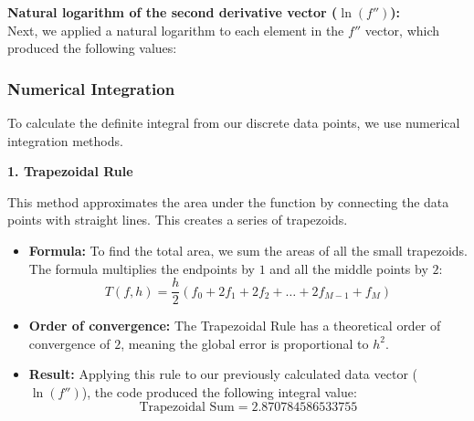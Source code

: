 \vspace{5pt}
\noindent\textbf{Natural logarithm of the second derivative vector ($\ln(f'')$):} \\
Next, we applied a natural logarithm to each element in the $f''$ vector, which produced the following values:

\begin{center}
\end{center}

\vspace{10pt}
\subsubsection{Numerical Integration}

To calculate the definite integral from our discrete data points, we use numerical integration methods. 

\vspace{5pt}
\noindent\textbf{1. Trapezoidal Rule} \cite[page 255]{Sauer2014}

This method approximates the area under the function by connecting the data points with straight lines. This creates a series of trapezoids.

\begin{itemize}   
    \item \textbf{Formula:} To find the total area, we sum the areas of all the small trapezoids. The formula multiplies the endpoints by $1$ and all the middle points by $2$:
    \begin{equation}
        T(f, h) = \frac{h}{2}(f_0 + 2f_1 + 2f_2 + \dots + 2f_{M-1} + f_M)
    \end{equation}
    
    \item \textbf{Order of convergence:} The Trapezoidal Rule has a theoretical order of convergence of $2$, meaning the global error is proportional to $h^2$.
    
    \item \textbf{Result:} Applying this rule to our previously calculated data vector ($\ln(f'')$), the code produced the following integral value:
    \begin{equation*}
        \text{Trapezoidal Sum} = 2.870784586533755
    \end{equation*}
\end{itemize}

